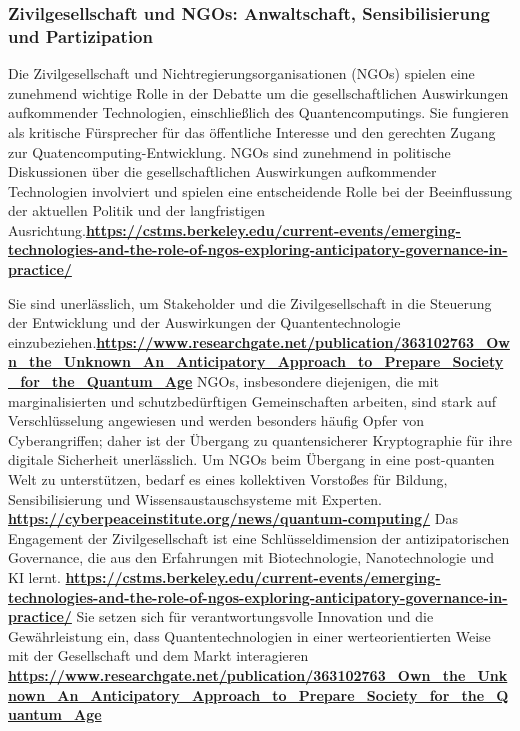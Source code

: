\subsubsection{Zivilgesellschaft und NGOs: Anwaltschaft, Sensibilisierung und Partizipation}
Die Zivilgesellschaft und Nichtregierungsorganisationen (NGOs) spielen eine zunehmend wichtige Rolle in der Debatte um die gesellschaftlichen Auswirkungen aufkommender Technologien, einschließlich des Quantencomputings. Sie fungieren als kritische Fürsprecher für das öffentliche Interesse und den gerechten Zugang zur Quatencomputing-Entwicklung. NGOs sind zunehmend in politische Diskussionen über die gesellschaftlichen Auswirkungen aufkommender Technologien involviert und spielen eine entscheidende Rolle bei der Beeinflussung der aktuellen Politik und der langfristigen Ausrichtung.\textbf{\href{https://cstms.berkeley.edu/current-events/emerging-technologies-and-the-role-of-ngos-exploring-anticipatory-governance-in-practice/}{https://cstms.berkeley.edu/current-events/emerging-technologies-and-the-role-of-ngos-exploring-anticipatory-governance-in-practice/}}

Sie sind unerlässlich, um Stakeholder und die Zivilgesellschaft in die Steuerung der Entwicklung und der Auswirkungen der Quantentechnologie einzubeziehen.\textbf{\href{https://www.researchgate.net/publication/363102763_Own_the_Unknown_An_Anticipatory_Approach_to_Prepare_Society_for_the_Quantum_Age}{https://www.researchgate.net/publication/363102763\_Own\_the\_Unknown\_An\_Anticipatory\_Approach\_to\_Prepare\_Society\_for\_the\_Quantum\_Age}} NGOs, insbesondere diejenigen, die mit marginalisierten und schutzbedürftigen Gemeinschaften arbeiten, sind stark auf Verschlüsselung angewiesen und werden besonders häufig Opfer von Cyberangriffen; daher ist der Übergang zu quantensicherer Kryptographie für ihre digitale Sicherheit unerlässlich. Um NGOs beim Übergang in eine post-quanten Welt zu unterstützen, bedarf es eines kollektiven Vorstoßes für Bildung, Sensibilisierung und Wissensaustauschsysteme mit Experten. \textbf{\href{https://cyberpeaceinstitute.org/news/quantum-computing/}{https://cyberpeaceinstitute.org/news/quantum-computing/}} Das Engagement der Zivilgesellschaft ist eine Schlüsseldimension der antizipatorischen Governance, die aus den Erfahrungen mit Biotechnologie, Nanotechnologie und KI lernt. \textbf{\href{https://cstms.berkeley.edu/current-events/emerging-technologies-and-the-role-of-ngos-exploring-anticipatory-governance-in-practice/}{https://cstms.berkeley.edu/current-events/emerging-technologies-and-the-role-of-ngos-exploring-anticipatory-governance-in-practice/}} Sie setzen sich für verantwortungsvolle Innovation und die Gewährleistung ein, dass Quantentechnologien in einer werteorientierten Weise mit der Gesellschaft und dem Markt interagieren \textbf{\href{https://www.researchgate.net/publication/363102763_Own_the_Unknown_An_Anticipatory_Approach_to_Prepare_Society_for_the_Quantum_Age}{https://www.researchgate.net/publication/363102763\_Own\_the\_Unknown\_An\_Anticipatory\_Approach\_to\_Prepare\_Society\_for\_the\_Quantum\_Age}}


